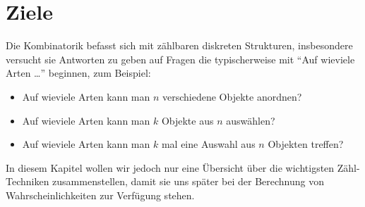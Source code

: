 \section{Ziele}
Die Kombinatorik befasst sich mit zählbaren diskreten Strukturen,
insbesondere versucht sie Antworten zu geben auf Fragen die
typischerweise mit ``Auf wieviele Arten \dots'' beginnen, zum Beispiel:
\begin{itemize}
\item Auf wieviele Arten kann man $n$ verschiedene Objekte anordnen?
\item Auf wieviele Arten kann man $k$ Objekte aus $n$ auswählen?
\item Auf wieviele Arten kann man $k$ mal eine Auswahl aus $n$ Objekten
treffen?
\end{itemize}

In diesem Kapitel wollen wir jedoch nur eine Übersicht über die
wichtigsten Zähl-Techniken zusammenstellen, damit sie uns später
bei der Berechnung von Wahrscheinlichkeiten zur Verfügung stehen.

